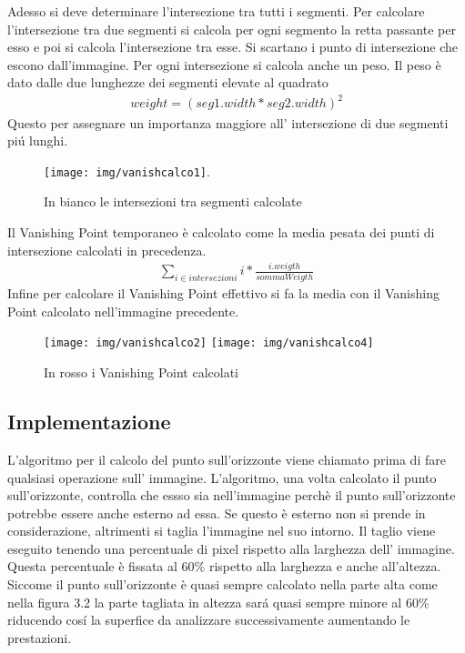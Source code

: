 		Adesso si deve determinare l'intersezione tra tutti i segmenti. Per calcolare l'intersezione tra due segmenti si calcola per ogni segmento la retta passante per esso e poi si calcola l'intersezione tra esse. Si scartano i punto di intersezione che escono dall'immagine. Per ogni intersezione si calcola anche un peso. Il peso è dato dalle due lunghezze dei segmenti elevate al quadrato
		\begin{align*}
			weight = (seg1.width * seg2.width)^{2}
		\end{align*}
		Questo per assegnare un importanza maggiore all' intersezione di due segmenti pi\'u lunghi.
		\begin{figure}[!ht]
			\centering
			\texttt{[image: img/vanishcalco1]}.
			\caption[Intersezioni dei segmenti]{In bianco le intersezioni tra segmenti calcolate}
		\end{figure}
		Il Vanishing Point temporaneo è calcolato come la media pesata dei punti di intersezione calcolati in precedenza.
		\begin{align*}
			\sum\limits_{i \in intersezioni} i * \frac{i.weigth}{sommaWeigth}
		\end{align*}
		Infine per calcolare il Vanishing Point effettivo si fa la media con il Vanishing Point calcolato nell'immagine precedente.

		\begin{figure}[!ht]
			\centering
			\texttt{[image: img/vanishcalco2]}
			\hspace{7mm}
			\texttt{[image: img/vanishcalco4]}
			\caption[Vanishing Point calcolati]{In rosso i Vanishing Point calcolati}
		\end{figure}

	\subsection{Implementazione}
		L'algoritmo per il calcolo del punto sull'orizzonte viene chiamato prima di fare qualsiasi operazione sull' immagine. L'algoritmo, una volta calcolato il punto sull'orizzonte, controlla che essso sia nell'immagine perchè il punto sull'orizzonte potrebbe essere anche esterno ad essa. Se questo è esterno non si prende in considerazione, altrimenti si taglia l'immagine nel suo intorno. Il taglio viene eseguito tenendo una percentuale di pixel rispetto alla larghezza dell' immagine. Questa percentuale è fissata al 60\% rispetto alla larghezza e anche all'altezza. Siccome il punto sull'orizzonte è quasi sempre calcolato nella parte alta come nella figura 3.2 la parte tagliata in altezza sar\'a quasi sempre minore al 60\% riducendo cos\'i la superfice da analizzare successivamente aumentando le prestazioni. 

